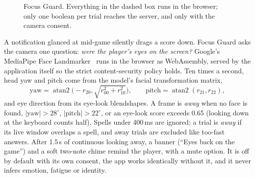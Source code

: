 \documentclass[11pt,a4paper]{article}
\begin{document}
\begin{figure}[H]
\centering
{}
\caption{Focus Guard. Everything in the dashed box runs in the browser; only one boolean per trial reaches the server, and only with the camera consent.}
\label{fig:focus}
\end{figure}

A notification glanced at mid-game silently drags a score down. Focus Guard asks the camera one question: \emph{were the player's eyes on the screen?} Google's MediaPipe Face Landmarker~\cite{mediapipe} runs in the browser as WebAssembly, served by the application itself so the strict content-security policy holds. Ten times a second, head yaw and pitch come from the model's facial transformation matrix,
\begin{equation}
\text{yaw}=\operatorname{atan2}\!\big(-r_{20},\sqrt{r_{00}^2+r_{10}^2}\big),\qquad \text{pitch}=\operatorname{atan2}(r_{21},r_{22}),
\end{equation}
and eye direction from its eye-look blendshapes. A frame is \emph{away} when no face is found, $|\text{yaw}|>28^\circ$, $|\text{pitch}|>22^\circ$, or an eye-look score exceeds 0.65 (looking down at the keyboard counts half). Spells under 400\,ms are ignored; a trial is \emph{away} if its live window overlaps a spell, and away trials are excluded like too-fast answers. After 1.5\,s of continuous looking away, a banner (``Eyes back on the game'') and a soft two-note chime remind the player, with a mute option. It is off by default with its own consent, the app works identically without it, and it never infers emotion, fatigue or identity.
\end{document}
